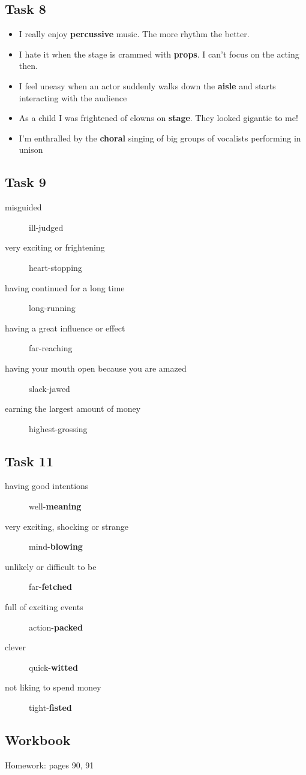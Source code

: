 \documentclass[a4paper]{article}
\begin{document}
\subsection{Task 8}
\begin{itemize}
    \item I really enjoy {\bf percussive} music. The more rhythm the better.
    \item I hate it when the stage is crammed with {\bf props}. I can't focus on the acting then.
    \item I feel uneasy when an actor suddenly walks down the {\bf aisle} and starts interacting with the audience
    \item As a child I was frightened of clowns on {\bf stage}. They looked gigantic to me!
    \item I'm enthralled by the {\bf choral} singing of big groups of vocalists performing in unison
\end{itemize}
\subsection{Task 9}
\begin{description}
    \item[misguided] ill-judged
    \item[very exciting or frightening] heart-stopping
    \item[having continued for a long time] long-running
    \item[having a great influence or effect] far-reaching
    \item[having your mouth open because you are amazed] slack-jawed
    \item[earning the largest amount of money] highest-grossing
\end{description}
\subsection{Task 11}
\begin{description}
    \item[having good intentions] well-{\bf meaning}
    \item[very exciting, shocking or strange] mind-{\bf blowing}
    \item[unlikely or difficult to be] far-{\bf fetched}
    \item[full of exciting events] action-{\bf packed}
    \item[clever] quick-{\bf witted}
    \item[not liking to spend money] tight-{\bf fisted}
\end{description}
\subsection{Workbook}
\appendix Homework: pages 90, 91
\end{document}
